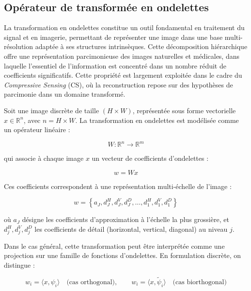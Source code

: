 \subsection{Opérateur de transformée en ondelettes}
La transformation en ondelettes constitue un outil fondamental en traitement du signal et en imagerie, permettant de représenter une image dans une base multi-résolution adaptée à ses structures intrinsèques. Cette décomposition hiérarchique offre une représentation parcimonieuse des images naturelles et médicales, dans laquelle l'essentiel de l'information est concentré dans un nombre réduit de coefficients significatifs. Cette propriété est largement exploitée dans le cadre du \textit{Compressive Sensing} (CS), où la reconstruction repose sur des hypothèses de parcimonie dans un domaine transformé.

Soit une image discrète de taille $(H \times W)$, représentée sous forme vectorielle $x \in \mathbb{R}^n$, avec $n = H \times W$. La transformation en ondelettes est modélisée comme un opérateur linéaire :

\begin{equation}
W : \mathbb{R}^n \rightarrow \mathbb{R}^m
\end{equation}

qui associe à chaque image $x$ un vecteur de coefficients d'ondelettes :

\begin{equation}
w = Wx
\end{equation}

Ces coefficients correspondent à une représentation multi-échelle de l'image :

\begin{equation}
w = \left\{ a_J, d_J^H, d_J^V, d_J^D, \dots, d_1^H, d_1^V, d_1^D \right\}
\end{equation}

où $a_J$ désigne les coefficients d'approximation à l'échelle la plus grossière, et $d_j^H, d_j^V, d_j^D$ les coefficients de détail (horizontal, vertical, diagonal) au niveau $j$.

Dans le cas général, cette transformation peut être interprétée comme une projection sur une famille de fonctions d'ondelettes. En formulation discrète, on distingue :

\begin{equation}
w_i = \langle x, \psi_i \rangle \quad \text{(cas orthogonal)}, \qquad
w_i = \langle x, \tilde{\psi}_i \rangle \quad \text{(cas biorthogonal)}
\end{equation}

